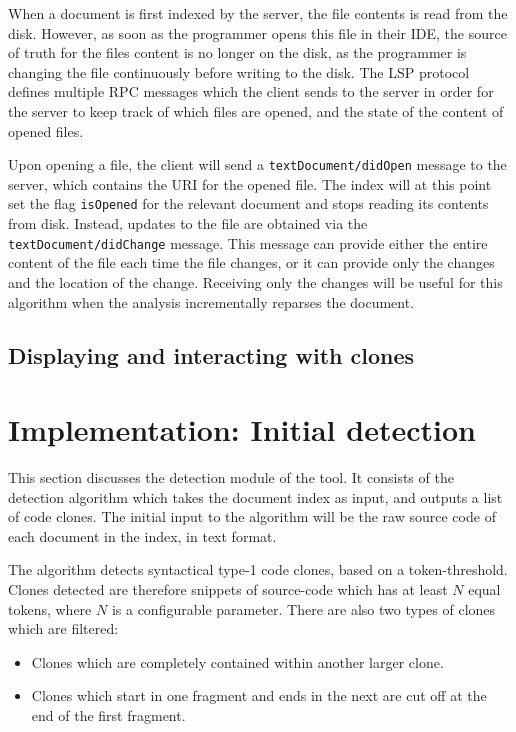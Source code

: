 When a document is first indexed by the server, the file contents is read from the disk.
However, as soon as the programmer opens this file in their IDE, the source of truth for
the files content is no longer on the disk, as the programmer is changing the file
continuously before writing to the disk. The LSP protocol defines multiple RPC
messages which the client sends to the server in order for the server to keep track of
which files are opened, and the state of the content of opened files.

Upon opening a file, the client will send a \verb|textDocument/didOpen| message to the
server, which contains the URI for the opened file. The index will at this point set the
flag \verb|isOpened| for the relevant document and stops reading its contents from disk.
Instead, updates to the file are obtained via the \verb|textDocument/didChange| message.
This message can provide either the entire content of the file each time the file changes,
or it can provide only the changes and the location of the change. Receiving only the
changes will be useful for this algorithm when the analysis incrementally reparses the
document.

\section{Displaying and interacting with clones}

\chapter{Implementation: Initial detection}


This section discusses the detection module of the tool. It consists of the detection
algorithm which takes the document index as input, and outputs a list of code clones. The
initial input to the algorithm will be the raw source code of each document in the index,
in text format.

The algorithm detects syntactical type-1 code clones, based on a token-threshold. Clones
detected are therefore snippets of source-code which has at least $N$ equal tokens, where
$N$ is a configurable parameter. There are also two types of clones which are filtered:

\begin{itemize}
    \item Clones which are completely contained within another larger clone.
    \item Clones which start in one fragment and ends in the next are cut off at the end
        of the first fragment.
\end{itemize}


